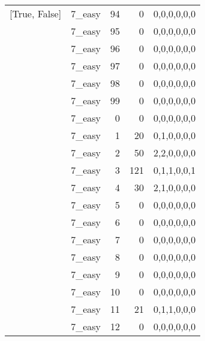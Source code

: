 \begin{tabular}{llrrl}
 [True, False]   & 7\_easy              &            94 &                     0 & 0,0,0,0,0,0   \\
 [True, False]   & 7\_easy              &            95 &                     0 & 0,0,0,0,0,0   \\
 [True, False]   & 7\_easy              &            96 &                     0 & 0,0,0,0,0,0   \\
 [True, False]   & 7\_easy              &            97 &                     0 & 0,0,0,0,0,0   \\
 [True, False]   & 7\_easy              &            98 &                     0 & 0,0,0,0,0,0   \\
 [True, False]   & 7\_easy              &            99 &                     0 & 0,0,0,0,0,0   \\
 [True, False]   & 7\_easy              &             0 &                     0 & 0,0,0,0,0,0   \\
 [True, False]   & 7\_easy              &             1 &                    20 & 0,1,0,0,0,0   \\
 [True, False]   & 7\_easy              &             2 &                    50 & 2,2,0,0,0,0   \\
 [True, False]   & 7\_easy              &             3 &                   121 & 0,1,1,0,0,1   \\
 [True, False]   & 7\_easy              &             4 &                    30 & 2,1,0,0,0,0   \\
 [True, False]   & 7\_easy              &             5 &                     0 & 0,0,0,0,0,0   \\
 [True, False]   & 7\_easy              &             6 &                     0 & 0,0,0,0,0,0   \\
 [True, False]   & 7\_easy              &             7 &                     0 & 0,0,0,0,0,0   \\
 [True, False]   & 7\_easy              &             8 &                     0 & 0,0,0,0,0,0   \\
 [True, False]   & 7\_easy              &             9 &                     0 & 0,0,0,0,0,0   \\
 [True, False]   & 7\_easy              &            10 &                     0 & 0,0,0,0,0,0   \\
 [True, False]   & 7\_easy              &            11 &                    21 & 0,1,1,0,0,0   \\
 [True, False]   & 7\_easy              &            12 &                     0 & 0,0,0,0,0,0   \\

\end{tabular}

